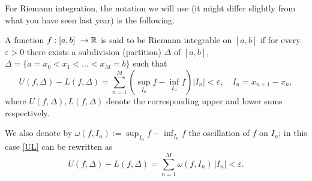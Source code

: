 \medskip
For Riemann integration, the notation we will use (it might differ slightly from what you have seen last year) is the following.
\bigskip
\begin{definition}
A function $f:[a,b]\ \to \mathbb{R}$ is said to be Riemann integrable on $[a,b]$ if for every $\varepsilon>0$ there exists a subdivision (partition) $\Delta$ of $[a,b]$, 
$\Delta = \{a=x_0<x_1<\dots<x_M=b\}$ such that 
\begin{equation}\label{UL}
U(f,\Delta) - L(f,\Delta) = \sum_{n=1}^M \left(\sup_{I_n} f - \inf_{I_n} f \right) |I_n| <\varepsilon, \quad I_n = x_{n+1}-x_n,
\end{equation}
where $U(f,\Delta), L(f,\Delta)$ denote the  corresponding upper and lower sums respectively. 

We also denote by $\omega(f,I_n):= \sup_{I_n} f - \inf_{I_n} f$ the oscillation of $f$ on $I_n$; in this case \eqref{UL} can be rewritten as 
$$
U(f,\Delta) - L(f,\Delta) = \sum_{n=1}^M \omega(f,I_n)\, |I_n| <\varepsilon.
$$

\end{definition}
